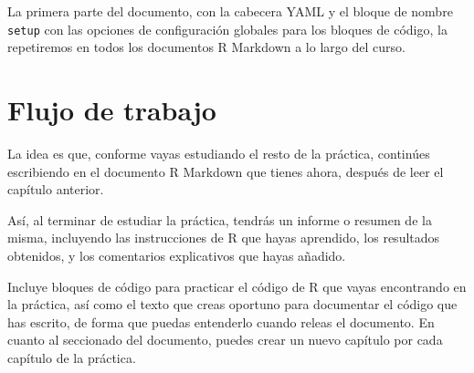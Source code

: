 \documentclass[
  title=normal,
  notoc,
  bib=normal]{mnye}
\newenvironment{Shaded}{\begin{snugshade}}{\end{snugshade}}
\newcommand{\AnnotationTok}[1]{\textcolor[rgb]{0.56,0.35,0.01}{\textbf{\textit{#1}}}}
\newcommand{\CommentTok}[1]{\textcolor[rgb]{0.56,0.35,0.01}{\textit{#1}}}
\newcommand{\FunctionTok}[1]{\textcolor[rgb]{0.00,0.00,0.00}{#1}}
\newcommand{\InformationTok}[1]{\textcolor[rgb]{0.56,0.35,0.01}{\textbf{\textit{#1}}}}
\begin{document}
\begin{Shaded}
\end{Shaded}

La primera parte del documento, con la cabecera YAML y el bloque de nombre \texttt{setup} con las opciones de configuración globales para los bloques de código, la repetiremos en todos los documentos R Markdown a lo largo del curso.

\hypertarget{flow}{%
\section{Flujo de trabajo}\label{flow}}

La idea es que, conforme vayas estudiando el resto de la práctica, continúes escribiendo en el documento R Markdown que tienes ahora, después de leer el capítulo anterior.

Así, al terminar de estudiar la práctica, tendrás un informe o resumen de la misma, incluyendo las instrucciones de \textsf{R} que hayas aprendido, los resultados obtenidos, y los comentarios explicativos que hayas añadido.

Incluye bloques de código para practicar el código de \textsf{R} que vayas encontrando en la práctica, así como el texto que creas oportuno para documentar el código que has escrito, de forma que puedas entenderlo cuando releas el documento. En cuanto al seccionado del documento, puedes crear un nuevo capítulo por cada capítulo de la práctica.
\end{document}
